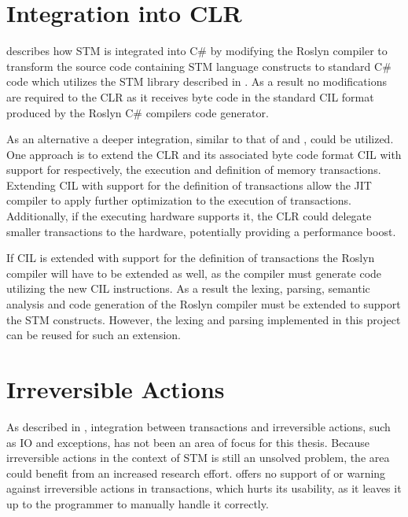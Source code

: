 \section{Integration into \acs{CLR}}\label{sec:fut_inte_clr}
 describes how \ac{STM} is integrated into C\# by modifying the Roslyn compiler to transform the source code containing \ac{STM} language constructs to standard C\# code which utilizes the \ac{STM} library described in . As a result no modifications are required to the \ac{CLR} as it receives byte code in the standard \ac{CIL} format produced by the Roslyn C\# compilers code generator.

As an alternative a deeper integration, similar to that of \cite{harris2003language} and \cite{duffy2010stmnet}, could be utilized. One approach is to extend the \ac{CLR} and its associated byte code format \ac{CIL} with support for respectively, the execution and definition of memory transactions. Extending \ac{CIL} with support for the definition of transactions allow the \ac{JIT} compiler to apply further optimization to the execution of transactions. Additionally, if the executing hardware supports it, the \ac{CLR} could delegate smaller transactions to the hardware, potentially providing a performance boost.

If \ac{CIL} is extended with support for the definition of transactions the Roslyn compiler will have to be extended as well, as the compiler must generate code utilizing the new \ac{CIL} instructions. As a result the lexing, parsing, semantic analysis and code generation of the Roslyn compiler must be extended to support the \ac{STM} constructs. However, the lexing and parsing implemented in this project can be reused for such an extension.
% 
\section{Irreversible Actions}\label{sec:fut_irreversible_actions}
As described in , integration between transactions and irreversible actions, such as \ac{IO} and exceptions, has not been an area of focus for this thesis.  Because irreversible actions in the context of \ac{STM} is still an unsolved problem\cite{harris2005exceptions}, the area could benefit from an increased research effort. \stmname offers no support of or warning against irreversible actions in transactions, which hurts its usability, as it leaves it up to the programmer to manually handle it correctly.

